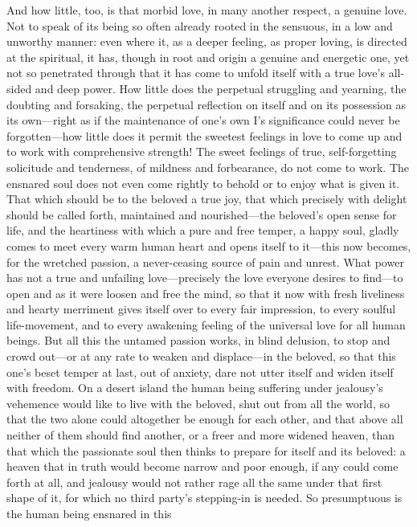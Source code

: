 \documentclass[12pt,a4paper]{book}
\begin{document}
And how little, too, is that morbid love, in many another respect, a
genuine love. Not to speak of its being so often already rooted in the
sensuous, in a low and unworthy manner: even where it, as a deeper feeling,
as proper loving, is directed at the spiritual, it has, though in root and
origin a genuine and energetic one, yet not so penetrated through that it
has come to unfold itself with a true love's all-sided and deep power. How
little does the perpetual struggling and yearning, the doubting and
forsaking, the perpetual reflection on itself and on its possession as its
own---right as if the maintenance of one's own I's significance could never
be forgotten---how little does it permit the sweetest feelings in love to
come up and to work with comprehensive strength! The sweet feelings of
true, self-forgetting solicitude and tenderness, of mildness and
forbearance, do not come to work. The ensnared soul does not even come
rightly to behold or to enjoy what is given it. That which should be to the
beloved a true joy, that which precisely with delight should be called
forth, maintained and nourished---the beloved's open sense for life, and
the heartiness with which a pure and free temper, a happy soul, gladly
comes to meet every warm human heart and opens itself to it---this now
becomes, for the wretched passion, a never-ceasing source of pain and
unrest. What power has not a true and unfailing love---precisely the love
everyone desires to find---to open and as it were loosen and free the mind,
so that it now with fresh liveliness and hearty merriment gives itself over
to every fair impression, to every soulful life-movement, and to every
awakening feeling of the universal love for all human beings. But all this
the untamed passion works, in blind delusion, to stop and crowd out---or at
any rate to weaken and displace---in the beloved, so that this one's beset
temper at last, out of anxiety, dare not utter itself and widen itself with
freedom. On a desert island the human being suffering under jealousy's
vehemence would like to live with the beloved, shut out from all the world,
so that the two alone could altogether be enough for each other, and that
above all neither of them should find another, or a freer and more widened
heaven, than that which the passionate soul then thinks to prepare for
itself and its beloved: a heaven that in truth would become narrow and poor
enough, if any could come forth at all, and jealousy would not rather rage
all the same under that first shape of it, for which no third party's
stepping-in is needed. So presumptuous is the human being ensnared in this
\end{document}
